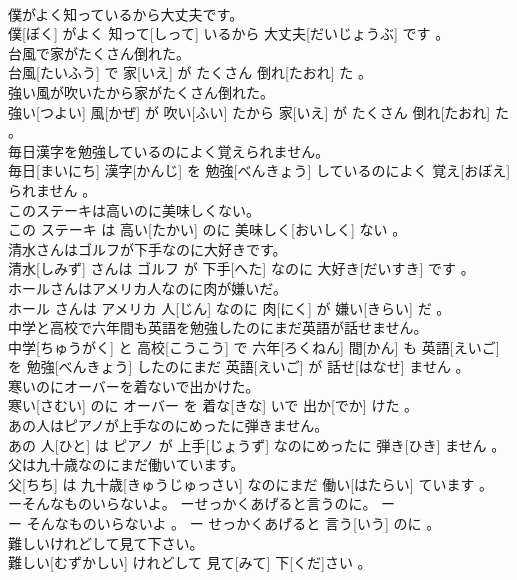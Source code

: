 \documentclass[8pt]{extreport}
\begin{document}
\begin{CJK}{UTF8}{min}
\\	僕がよく知っているから大丈夫です。	
\\	僕[ぼく] がよく 知って[しって] いるから 大丈夫[だいじょうぶ] です 。
\\	台風で家がたくさん倒れた。	
\\	台風[たいふう] で 家[いえ] が たくさん 倒れ[たおれ] た 。
\\	強い風が吹いたから家がたくさん倒れた。	
\\	強い[つよい] 風[かぜ] が 吹い[ふい] たから 家[いえ] が たくさん 倒れ[たおれ] た 。
\\	毎日漢字を勉強しているのによく覚えられません。	
\\	毎日[まいにち] 漢字[かんじ] を 勉強[べんきょう] しているのによく 覚え[おぼえ] られません 。
\\	このステーキは高いのに美味しくない。	
\\	この ステーキ は 高い[たかい] のに 美味しく[おいしく] ない 。
\\	清水さんはゴルフが下手なのに大好きです。	
\\	清水[しみず] さんは ゴルフ が 下手[へた] なのに 大好き[だいすき] です 。
\\	ホールさんはアメリカ人なのに肉が嫌いだ。	
\\	ホール さんは アメリカ 人[じん] なのに 肉[にく] が 嫌い[きらい] だ 。
\\	中学と高校で六年間も英語を勉強したのにまだ英語が話せません。	
\\	中学[ちゅうがく] と 高校[こうこう] で 六年[ろくねん] 間[かん] も 英語[えいご] を 勉強[べんきょう] したのにまだ 英語[えいご] が 話せ[はなせ] ません 。
\\	寒いのにオーバーを着ないで出かけた。	
\\	寒い[さむい] のに オーバー を 着な[きな] いで 出か[でか] けた 。
\\	あの人はピアノが上手なのにめったに弾きません。	
\\	あの 人[ひと] は ピアノ が 上手[じょうず] なのにめったに 弾き[ひき] ません 。
\\	父は九十歳なのにまだ働いています。	
\\	父[ちち] は 九十歳[きゅうじゅっさい] なのにまだ 働い[はたらい] ています 。
\\	ーそんなものいらないよ。 ーせっかくあげると言うのに。	ー
\\	ー そんなものいらないよ 。 ー せっかくあげると 言う[いう] のに 。
\\	難しいけれどして見て下さい。	
\\	難しい[むずかしい] けれどして 見て[みて] 下[くだ]さい 。

\end{CJK}
\end{document}
